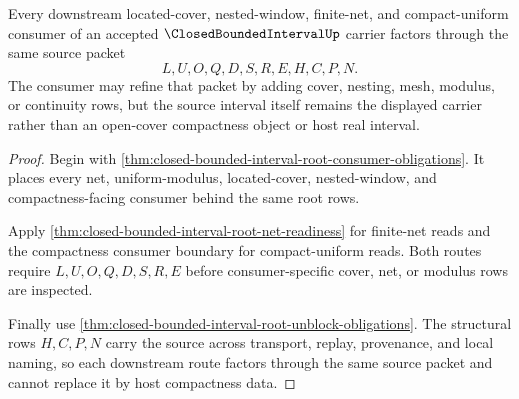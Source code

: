 \begin{theorem}
\label{thm:closed-bounded-interval-downstream-coverage-surface}
Every downstream located-cover, nested-window, finite-net, and compact-uniform consumer of an accepted $\ClosedBoundedIntervalUp$ carrier factors through the same source packet
$$
L,U,O,Q,D,S,R,E,H,C,P,N.
$$
The consumer may refine that packet by adding cover, nesting, mesh, modulus, or continuity rows, but the source interval itself remains the displayed carrier rather than an open-cover compactness object or host real interval.
\end{theorem}
\begin{proof}
Begin with \autoref{thm:closed-bounded-interval-root-consumer-obligations}. It places every net, uniform-modulus, located-cover, nested-window, and compactness-facing consumer behind the same root rows.

Apply \autoref{thm:closed-bounded-interval-root-net-readiness} for finite-net reads and the compactness consumer boundary for compact-uniform reads. Both routes require $L,U,O,Q,D,S,R,E$ before consumer-specific cover, net, or modulus rows are inspected.

Finally use \autoref{thm:closed-bounded-interval-root-unblock-obligations}. The structural rows $H,C,P,N$ carry the source across transport, replay, provenance, and local naming, so each downstream route factors through the same source packet and cannot replace it by host compactness data.
\end{proof}

